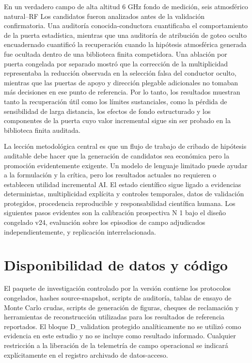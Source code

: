\documentclass{ieeeaccess}
\begin{document}
En un verdadero campo de alta altitud 6 GHz fondo de medición, seis atmosférico natural--RF Los candidatos fueron analizados antes de la validación confirmatoria. Una auditoría conocida-conductora cuantificaba el comportamiento de la puerta estadística, mientras que una auditoría de atribución de goteo oculto encuadernado cuantificó la recuperación cuando la hipótesis atmosférica generada fue ocultada dentro de una biblioteca finita competidora. Una ablación por puerta congelada por separado mostró que la corrección de la multiplicidad representaba la reducción observada en la selección falsa del conductor oculto, mientras que las puertas de apoyo y dirección plegable adicionales no tomaban más decisiones en ese punto de referencia. Por lo tanto, los resultados muestran tanto la recuperación útil como los límites sustanciales, como la pérdida de sensibilidad de larga distancia, los efectos de fondo estructurado y los componentes de la puerta cuyo valor incremental sigue sin ser probado en la biblioteca finita auditada.

La lección metodológica central es que un flujo de trabajo de cribado de hipótesis auditable debe hacer que la generación de candidatos sea económica pero la promoción evidentemente exigente. Un modelo de lenguaje limitado puede ayudar a la formulación y la crítica, pero los resultados actuales no requieren o establecen utilidad incremental AI. El estado científico sigue ligado a evidencias deterministas, multiplicidad explícita y controles temporales, datos de validación protegidos, procedencia reproducible y responsabilidad científica humana. Los siguientes pasos evidentes son la calibración prospectiva N 1 bajo el diseño congelado v24, evaluación sobre los episodios de campo adjudicados independientemente, y replicación interrelacionada.

\section*{Disponibilidad de datos y código}\label{disponibilidad-de-datos-y-cuxf3digo}

El paquete de investigación controlado por la versión contiene los protocolos congelados, hashes source-snapshot, scripts de auditoría, tablas de ensayo de Monte Carlo crudas, scripts de generación de figuras, cheques de reclamación y herramientas de reconstrucción utilizadas para los resultados de referencia reportados. El bloque D\_validation protegido analíticamente no se utilizó como evidencia en este estudio y no se incluye como resultado informado. Cualquier restricción a la liberación de la telemetría de campo operacional se indicará explícitamente en el registro archivado de datos-acceso.
\end{document}
